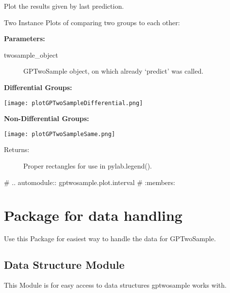 \documentclass[letterpaper,10pt]{sphinxmanual}
\begin{document}
\begin{fulllineitems}
\label{plot:gptwosample.plot.plot_basic.plot_results}
Plot the results given by last prediction.

Two Instance Plots of comparing two groups to each other:

\textbf{Parameters:}
\begin{description}
\item[{twosample\_object}] \leavevmode{[}\code{gptwosample.twosample}{]}
GPTwoSample object, on which already `predict' was called.

\end{description}

\textbf{Differential Groups:}

\texttt{[image: plotGPTwoSampleDifferential.png]}

\textbf{Non-Differential Groups:}

\texttt{[image: plotGPTwoSampleSame.png]}
\begin{description}
\item[{Returns:}] \leavevmode
Proper rectangles for use in pylab.legend().

\end{description}

\end{fulllineitems}


\#  .. automodule:: gptwosample.plot.interval
\#    :members:
\label{data:module-gptwosample.data}

\chapter{Package for data handling}
\label{data:package-for-data-handling}\label{data::doc}
Use this Package for easiest way to handle the data for GPTwoSample.
\label{data:module-gptwosample.data.data_base}

\section{Data Structure Module}
\label{data:data-structure-module}
This Module is for easy access to data structures gptwosample works with.
\end{document}
